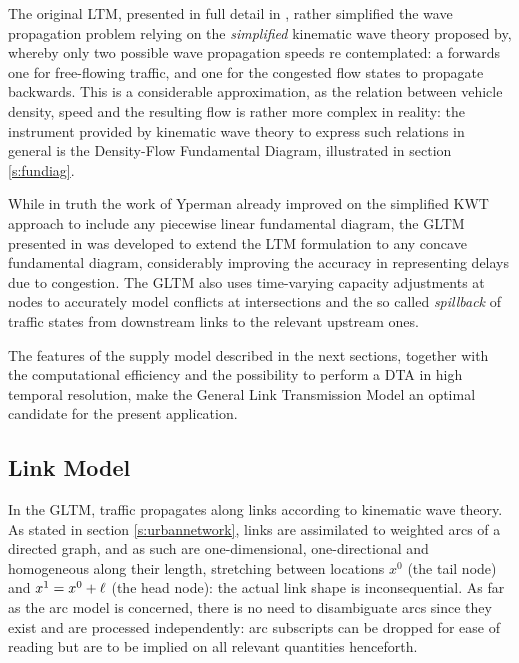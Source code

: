 The original LTM, presented in full detail in \cite{yperman2007link}, rather simplified the wave propagation problem relying on the \emph{simplified} kinematic wave theory proposed by\citep{newell1993simplified}, whereby only two possible wave propagation speeds re contemplated: a forwards one for free-flowing traffic, and one for the congested flow states to propagate backwards.
This is a considerable approximation, as the relation between vehicle density, speed and the resulting flow is rather more complex in reality:
the instrument provided by kinematic wave theory to express such relations in general is the Density-Flow Fundamental Diagram, illustrated in section \ref{s:fundiag}.

While in truth the work of Yperman already improved on the simplified KWT approach to include any piecewise linear fundamental diagram, the GLTM presented in \cite{gentile2010general} was developed to extend the LTM formulation to any concave fundamental diagram, considerably improving the accuracy in representing delays due to congestion. The GLTM also uses time-varying capacity adjustments at nodes to accurately model conflicts at intersections and the so called \emph{spillback} of traffic states from downstream links to the relevant upstream ones.

The features of the supply model described in the next sections, together with the computational efficiency and the possibility to perform a DTA in high temporal resolution, make the General Link Transmission Model an optimal candidate for the present application.




\subsection{Link Model}
In the GLTM, traffic propagates along links according to kinematic wave theory.
As stated in section \ref{s:urbannetwork}, links are assimilated to weighted arcs of a directed graph, and as such are one-dimensional, one-directional and homogeneous along their length, stretching between locations $x^0$ (the tail node) and $x^1 = x^0 + \ell$ (the head node): the actual link shape is inconsequential. As far as the arc model is concerned, there is no need to disambiguate arcs since they exist and are processed independently: arc subscripts can be dropped for ease of reading but are to be implied on all relevant quantities henceforth.

